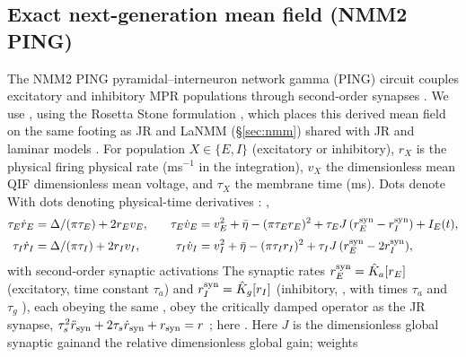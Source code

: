 \documentclass[11pt,a4paper]{article}
\providecommand{\DIFaddtex}[1]{{\protect\color{blue} \sf #1}} %
\providecommand{\DIFdeltex}[1]{{\protect\color{red} \scriptsize #1}} %
\providecommand{\DIFaddbegin}{} %
\providecommand{\DIFaddend}{} %
\providecommand{\DIFdelbegin}{} %
\providecommand{\DIFdelend}{} %
\providecommand{\DIFadd}[1]{\texorpdfstring{\DIFaddtex{#1}}{#1}} %
\providecommand{\DIFdel}[1]{\texorpdfstring{\DIFdeltex{#1}}{}} %
\begin{document}
\subsection{Exact next-generation mean field (NMM2 PING)}\label{sec:nmm2-methods}
The \DIFdelbegin \DIFdel{NMM2 PING}\DIFdelend \DIFaddbegin \DIFadd{pyramidal--interneuron network gamma (PING) }\DIFaddend circuit couples excitatory
and inhibitory MPR populations through second-order synapses
\cite{montbrio2015,ruffini2021nmm2,clusella2023}\DIFdelbegin \DIFdel{.
We use }\DIFdelend \DIFaddbegin \DIFadd{, using }\DIFaddend the Rosetta Stone
formulation \DIFdelbegin \DIFdel{\cite{ruffini2025rosetta}, which places this
derived mean field on the same footing as JR and LaNMM (\S\ref{sec:nmm})}\DIFdelend \DIFaddbegin \DIFadd{shared with JR and laminar models \cite{ruffini2025rosetta}}\DIFaddend .
For population $X\in\{E,I\}$\DIFdelbegin \DIFdel{(excitatory or inhibitory)}\DIFdelend , $r_X$ is \DIFdelbegin \DIFdel{the physical firing }\DIFdelend \DIFaddbegin \DIFadd{physical }\DIFaddend rate (ms$^{-1}$\DIFdelbegin \DIFdel{in the integration}\DIFdelend ),
$v_X$ \DIFdelbegin \DIFdel{the dimensionless mean QIF
}\DIFdelend \DIFaddbegin \DIFadd{dimensionless mean }\DIFaddend voltage, and $\tau_X$ \DIFdelbegin \DIFdel{the }\DIFdelend membrane time (ms).
\DIFdelbegin \DIFdel{Dots denote }\DIFdelend \DIFaddbegin \DIFadd{With dots denoting }\DIFaddend physical-time derivatives\DIFdelbegin \DIFdel{:
}\DIFdelend \DIFaddbegin \DIFadd{,
}\DIFaddend \begin{equation}
\begin{aligned}
\tau_E\dot r_E&=\Delta/(\pi\tau_E)+2r_Ev_E, &\quad
\tau_E\dot v_E&=v_E^2+\bar\eta-(\pi\tau_E r_E)^2+\tau_E J\,(r_E^{\rm syn}-r_I^{\rm syn})+I_E(t),\\[2pt]
\tau_I\dot r_I&=\Delta/(\pi\tau_I)+2r_Iv_I, &\quad
\tau_I\dot v_I&=v_I^2+\bar\eta-(\pi\tau_I r_I)^2+\tau_I J\,(r_E^{\rm syn}-2r_I^{\rm syn}),
\end{aligned}
\label{eq:nmm2-ping}
\end{equation}
\DIFdelbegin \DIFdel{with second-order synaptic activations }\DIFdelend \DIFaddbegin \DIFadd{The synaptic rates }\DIFaddend $r_E^{\rm syn}=\hat K_a[r_E]$ \DIFdelbegin \DIFdel{(excitatory, time constant
$\tau_a$) }\DIFdelend and
$r_I^{\rm syn}=\hat K_g[r_I]$\DIFdelbegin \DIFdel{(inhibitory, }\DIFdelend \DIFaddbegin \DIFadd{, with times $\tau_a$ and }\DIFaddend $\tau_g$\DIFdelbegin \DIFdel{),
each obeying the same
}\DIFdelend \DIFaddbegin \DIFadd{,
obey the }\DIFaddend critically damped operator
\DIFdelbegin \DIFdel{as the JR synapse, }\DIFdelend $\tau_s^2\ddot r_{\rm syn}+2\tau_s\dot r_{\rm syn}+r_{\rm syn}=r$\DIFdelbegin \DIFdel{; here }\DIFdelend \DIFaddbegin \DIFadd{.
Here }\DIFaddend $J$ is \DIFdelbegin \DIFdel{the dimensionless global synaptic gainand the relative }\DIFdelend \DIFaddbegin \DIFadd{dimensionless global gain; }\DIFaddend weights
\end{document}
